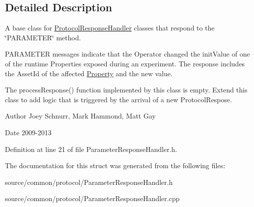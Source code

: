 \subsection{Detailed Description}
A base class for \hyperlink{struct_picto_1_1_protocol_response_handler}{Protocol\-Response\-Handler} classes that respond to the \char`\"{}\-P\-A\-R\-A\-M\-E\-T\-E\-R\char`\"{} method. 

P\-A\-R\-A\-M\-E\-T\-E\-R messages indicate that the Operator changed the init\-Value of one of the runtime Properties exposed during an experiment. The response includes the Asset\-Id of the affected \hyperlink{class_picto_1_1_property}{Property} and the new value.

The process\-Response() function implemented by this class is empty. Extend this class to add logic that is triggered by the arrival of a new Protocol\-Respose. \begin{DoxyAuthor}{Author}
Joey Schnurr, Mark Hammond, Matt Gay 
\end{DoxyAuthor}
\begin{DoxyDate}{Date}
2009-\/2013 
\end{DoxyDate}


Definition at line 21 of file Parameter\-Response\-Handler.\-h.



The documentation for this struct was generated from the following files\-:\begin{DoxyCompactItemize}
\item 
source/common/protocol/Parameter\-Response\-Handler.\-h\item 
source/common/protocol/Parameter\-Response\-Handler.\-cpp\end{DoxyCompactItemize}
